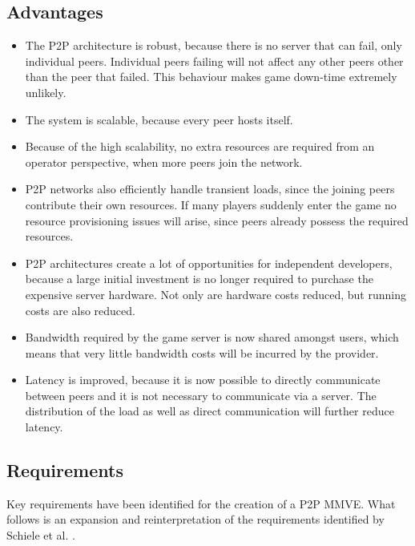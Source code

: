 \subsection{Advantages}
\label{p2p_mmve_advantages}

\begin{itemize}
\item The P2P architecture is robust, because there is no server that can fail, only individual peers. Individual peers failing will not affect any other peers other than the peer that failed. This behaviour makes game down-time extremely unlikely.

\item The system is scalable, because every peer hosts itself.

\item Because of the high scalability, no extra resources are required from an operator perspective, when more peers join the network.

\item P2P networks also efficiently handle transient loads, since the joining peers contribute their own resources. If many players suddenly enter the
game no resource provisioning issues will arise, since peers already possess the required resources.

\item P2P architectures create a lot of opportunities for independent developers, because a large initial investment is no longer required to purchase
the expensive server hardware. Not only are hardware costs reduced, but running costs are also reduced.

\item Bandwidth required by the game server is now shared amongst users, which means that very little bandwidth costs will be incurred by the provider.

\item Latency is improved, because it is now possible to directly communicate between peers and it is not necessary to communicate via a server.
The distribution of the load as well as direct communication will further reduce latency.
\end{itemize}

\subsection{Requirements}

Key requirements have been identified for the creation of a P2P MMVE. What follows is an expansion and reinterpretation of the requirements identified by Schiele et al. \cite{Schiele_p2p_requirements}.

